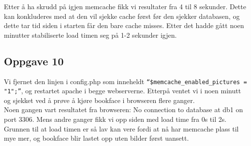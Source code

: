 \documentclass[a4paper, norsk, 12pt]{article}
\begin{document}
Etter å ha skrudd på igjen memcache fikk vi resultater fra 4 til 8 sekunder. Dette kan konkluderes med at den vil sjekke cache først før den sjekker databasen, og dette tar tid siden i starten får den bare cache misses. Etter det hadde gått noen minutter stabiliserte load timen seg på 1-2 sekunder igjen.

\subsection{Oppgave 10}
Vi fjernet den linjen i config.php som inneheldt \verb|“$memcache_enabled_pictures = "1";”|, og restartet apache i begge webserverne. Etterpå ventet vi i noen minutt og sjekket ved å prøve å kjøre bookface i browseren flere ganger. \\

Noen gangen vart resultatet fra browseren: No connection to database at db1 on port 3306. Mens andre ganger fikk vi opp siden med load time fra 0s til 2s. Grunnen til at load timen er så lav kan vere fordi at nå har memcache plass til mye mer, og bookface blir lastet opp uten bilder først uansett.



%

\end{document}
